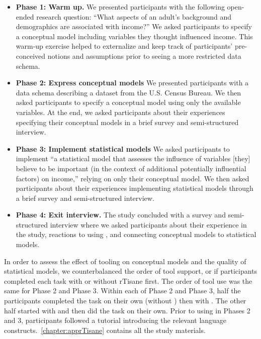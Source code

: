 \begin{itemize}
    \item \textbf{Phase 1: Warm up.} We presented participants with the
    following open-ended research question: ``What aspects of an adult's
    background and demographics are associated with income?'' We asked
    participants to specify a conceptual model including variables they thought
    influenced income. This warm-up exercise helped to externalize and keep
    track of participants' pre-conceived notions and assumptions prior to seeing
    a more restricted data schema.
    \item \textbf{Phase 2: Express conceptual models} We presented participants
    with a data schema describing a dataset from the U.S. Census Bureau. We then
    asked participants to specify a conceptual model using only the available
    variables. At the end, we asked participants about their
    experiences specifying their conceptual models in a brief survey and semi-structured interview.
    \item \textbf{Phase 3: Implement statistical models} We asked participants
    to implement ``a statistical model that assesses the influence of variables
    [they] believe to be important (in the context of additional potentially
    influential factors) on income,'' relying on only their conceptual model. 
    We then asked participants about their experiences implementing statistical
    models through a brief survey and semi-structured interview. 
    \item \textbf{Phase 4: Exit interview.} The study concluded with a survey
    and semi-structured interview where we asked participants about their
    experience in the study, reactions to using \rTisane, and connecting
    conceptual models to statistical models.
\end{itemize} 

In order to assess the effect of tooling on conceptual models and the quality of
statistical models, we counterbalanced the order of tool support, or if
participants completed each task with or without rTisane first. The order of
tool use was the same for Phase 2 and Phase 3. Within each of Phase 2 and Phase 3,
half the participants completed the task on their own (without \rTisane) then
with \rTisane. The other half started with \rTisane and then did the task on
their own. Prior to using \rTisane in Phases 2 and 3, participants followed a
tutorial introducing the relevant language
constructs.~\autoref{chapter:apprTisane} contains all the study
materials.

